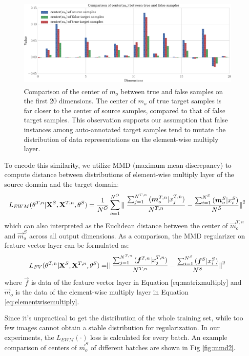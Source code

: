 \documentclass[runningheads]{llncs}
\begin{document}
\begin{figure}
\centering
\includegraphics[height=4.5cm]{images/mmd.pdf}
\caption{Comparison of the center of $m_{o}$ between true and false samples on the first 20 dimensions. The center of $m_{o}$ of true target samples is far closer to the center of source samples, compared to that of false target samples. This observation supports our assumption that false instances among auto-annotated target samples tend to mutate the distribution of data representations on the element-wise multiply layer.}
\label{fig:mmd}
\end{figure}

To encode this similarity, we utilize MMD (maximum mean discrepancy)\cite{huang2006correcting} to compute distance between distributions of element-wise multiply layer of the source domain and the target domain:
\begin{equation}\label{equation:LMMD}
  L_{EWM}(\theta^{T,n}|{\bf X}^{S},{\bf X}^{T,n},\theta^{S}) = \frac{1}{N^{O}} \sum^{N^{O}}_{o=1}{ \parallel \frac{\sum^{N^{T,n}}_{j=1}{(\vec{m}^{T,n}_{o}|x^{T,n}_{j})}}{N^{T,n}} - \frac{\sum^{N^{S}}_{i=1}{(\vec{m}^{S}_{o}|x^{S}_{i})}}{N^{S}} {\parallel}^{2}  }
\end{equation}
which can also interpreted as the Euclidean distance between the center of $\vec{m}^{T,n}_{o}$ and $\vec{m}^{S}_{o}$ across all output dimensions. As a comparison, the MMD regularizer on feature vector layer can be formulated as:
\begin{equation}\label{equation:LMMD}
  L_{FV}(\theta^{T,n}|{\bf X}^{S},{\bf X}^{T,n},\theta^{S}) = \parallel \frac{\sum^{N^{T,n}}_{j=1}{(\vec{f}^{T,n}|x^{T,n}_{j})}}{N^{T,n}} - \frac{\sum^{N^{S}}_{i=1}{(\vec{f}^{S}|x^{S}_{i})}}{N^{S}} {\parallel}^{2}
\end{equation}
where $\vec{f}$ is data of the feature vector layer in Equation \ref{eq:matrixmultiply} and $\vec{m}_{o}$ is the data of the element-wise multiply layer in Equation \ref{eq:elementwisemultiply}.

Since it's unpractical to get the distribution of the whole training set, while too few images cannot obtain a stable distribution for regularization. In our experiments, the $L_{EWM}(\cdot)$ loss is calculated for every batch. An example comparison of centers of $\vec{m}^{S}_{o}$ of different batches are shown in Fig \ref{fig:mmd2}.
\end{document}
